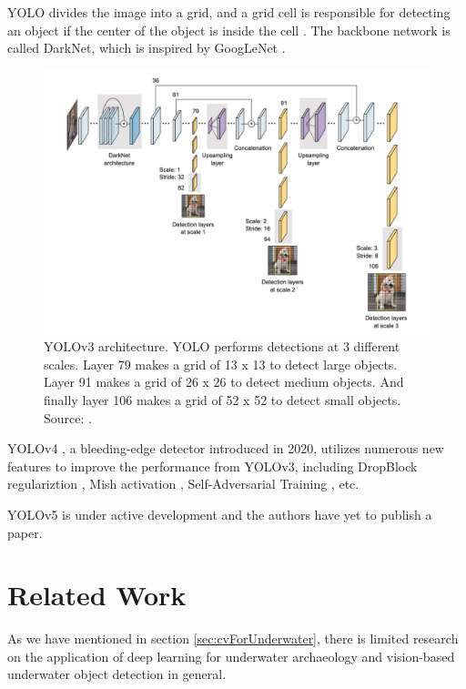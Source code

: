 \documentclass[a4paper, 11pt, oneside]{article}
\begin{document}
  YOLO divides the image into a grid, and a grid cell is responsible for detecting an object if the center of the object
  is inside the cell \cite{elgendy2020deep, redmon2016you}. The backbone network is called DarkNet, which is inspired by
  GoogLeNet \cite{elgendy2020deep, redmon2016you}.

  \begin{figure}[ht]
    \begin{center}
      \includegraphics[width=\textwidth]{yolov3.png}
    \end{center}
    \caption{YOLOv3 architecture. YOLO performs detections at 3 different scales. Layer 79 makes a grid of 13 x 13 to
    detect large objects. Layer 91 makes a grid of 26 x 26 to detect medium objects. And finally layer 106 makes a grid
    of 52 x 52 to detect small objects. Source: \cite{elgendy2020deep}.}
  \end{figure}

  YOLOv4 \cite{bochkovskiy2020yolov4}, a bleeding-edge detector introduced in 2020, utilizes numerous new features to
  improve the performance from YOLOv3, including DropBlock regulariztion \cite{ghiasi2018dropblock}, Mish activation
  \cite{misra2019mish}, Self-Adversarial Training \cite{bochkovskiy2020yolov4}, etc.

  YOLOv5 \cite{yolov5} is under active development and the authors have yet to publish a paper.

  \section{Related Work}

  As we have mentioned in section \ref{sec:cvForUnderwater}, there is limited research on the application of deep learning
  for underwater archaeology and vision-based underwater object detection in general.
\end{document}
